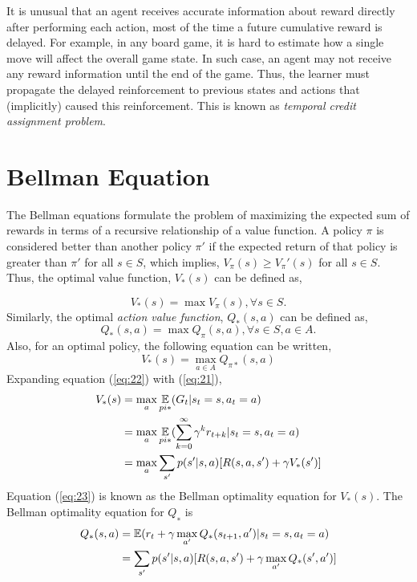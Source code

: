         It is unusual that an agent receives accurate information about reward directly after performing each action, most of the time a future cumulative reward is delayed. For example, in any board game, it is hard to estimate how a single move will affect the overall game state. In such case, an agent may not receive any reward information until the end of the game. Thus, the learner must propagate the delayed reinforcement to previous states and actions that (implicitly) caused this reinforcement. This is known as \textit{temporal credit assignment problem}.
        
    \section{Bellman Equation}\label{sec:24}
        The Bellman equations formulate the problem of maximizing the expected sum of rewards
        in terms of a recursive relationship of a value function. A policy $\pi$ is considered better than
        another policy $\pi'$ if the expected return of that policy is greater than $\pi'$ for all $s \in S$, which
        implies, $V_\pi (s) \geq V_\pi' (s)$ for all $s \in S$. Thus, the optimal value function, $V_*(s)$ can be defined
        as,
        
        \begin{equation*}
            V_* (s)= \max V_\pi(s), \forall s \in S.
        \end{equation*}
        Similarly, the optimal \textit{action value function}, $Q_*(s,a)$ can be defined as,
        \begin{equation*}
            Q_* (s,a)= \max Q_\pi(s,a), \forall s \in S, a \in A.
        \end{equation*}
        Also, for an optimal policy, the following equation can be written,
        \begin{equation} \label{eq:22}
            V_* (s)= \max_{a \in A} Q_{\pi*}(s,a)
        \end{equation}
        Expanding equation (\ref{eq:22}) with (\ref{eq:21}),
        \begin{equation} \label{eq:23}
            \begin{split}
                V_*(s) &=\max_{a}\operatorname*{\mathbb{E}}_{pi*}(G_t|s_t=s,a_t=a) \\
                & = \max_{a}\operatorname*{\mathbb{E}}_{pi*}(\sum_{k=0}^{\infty}\gamma^k r_{t+k } | s_t=s,a_t=a ) \\
                & = \max_{a}\sum_{s'}p(s'|s,a)[R(s,a,s')+\gamma V_*(s')]
            \end{split}
        \end{equation}
        Equation (\ref{eq:23}) is known as the Bellman optimality equation for $V_*(s)$. The Bellman optimality equation for $Q_∗$ is
        \begin{equation*}
            \begin{split}
                Q_*(s,a)& =\operatorname*{\mathbb{E}}(r_t+\gamma \max_{a'}Q_*(s_{t+1},a')|s_t=s,a_t=a) \\
                & = \sum_{s'}p(s'|s,a)[R(s,a,s')+\gamma\max_{a'}Q_*(s',a')]
            \end{split}
        \end{equation*}
        
